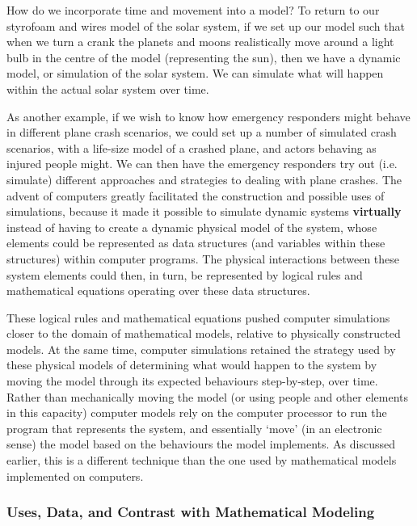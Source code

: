 How do we incorporate time and movement into a model? To return to our styrofoam and wires model of the solar system, if we set up our model such that when we turn a crank the planets and moons realistically move around a light bulb in the centre of the model (representing the sun), then we have a dynamic model, or simulation of the solar system. We can simulate what will happen within the actual solar system over time. \par As another example, if we wish to know how emergency responders might behave in different plane crash scenarios, we could set up a number of simulated crash scenarios, with a life-size model of a crashed plane, and actors behaving as injured people might. We can then have the emergency responders try out (i.e. simulate) different approaches and strategies to dealing with plane crashes.
\newl The advent of computers greatly facilitated the construction and possible uses of simulations, because it made it possible to simulate dynamic systems \textbf{virtually} instead of having to create a dynamic physical model of the system, whose elements could be represented as data structures (and variables within these structures) within computer programs. The physical interactions between these system elements could then, in turn, be represented by logical rules and mathematical equations operating over these data structures.

These logical rules and mathematical equations pushed computer simulations closer to the domain of mathematical models, relative to physically constructed models. At the same time, computer simulations retained the strategy used by these physical models of determining what would happen to the system by moving the model through its expected behaviours step-by-step, over time. Rather than mechanically moving the model (or using people and other elements in this capacity) computer models rely on the computer processor to run the program that represents the system, and essentially `move' (in an electronic sense) the model based on the behaviours the model implements. As discussed earlier, this is a different technique than the one used by mathematical models implemented on computers.

\subsubsection{Uses, Data, and Contrast with Mathematical Modeling}

